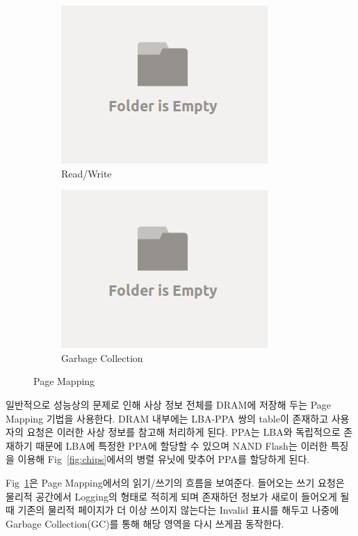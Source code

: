 \documentclass[conference]{IEEEtran}
\begin{document}
\begin{figure}[h]
	\centering
	\begin{subfigure}[b]{0.2\textwidth}	
		\includegraphics[width=\linewidth]{image/bg.png}
		\caption{Read/Write} \label{fig:PM}
	\end{subfigure}
	\begin{subfigure}[b]{0.2\textwidth}	
		\includegraphics[width=\linewidth]{image/bg.png}
		\caption{Garbage Collection} \label{fig:GC}
	\end{subfigure}
	\caption{Page Mapping}
\end{figure}
일반적으로 성능상의 문제로 인해 사상 정보 전체를 DRAM에 저장해 두는 Page Mapping 기법을 사용한다.
DRAM 내부에는 LBA-PPA 쌍의 table이 존재하고 사용자의 요청은 이러한 사상 정보를 참고해 처리하게 된다.
PPA는 LBA와 독립적으로 존재하기 때문에 LBA에 특정한 PPA에 할당할 수 있으며 NAND Flash는 이러한 특징을 이용해 Fig~\ref{fig:chips}에서의 병렬 유닛에 맞추어 PPA를 할당하게 된다.\par
Fig~\ref{fig:PM}은 Page Mapping에서의 읽기/쓰기의 흐름을 보여준다. 들어오는 쓰기 요청은 물리적 공간에서 Logging의 형태로 적히게 되며 존재하던 정보가 새로이 들어오게 될 때 기존의 물리적 페이지가 더 이상 쓰이지 않는다는 Invalid 표시를 해두고 나중에 Garbage Collection(GC)를 통해 해당 영역을 다시 쓰게끔 동작한다.
\end{document}
